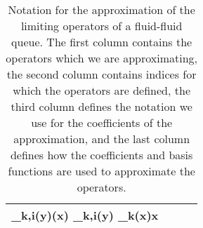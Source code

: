 \begin{table}[h!]
\begin{tabular}{c|c|c|c}
	 \bbpi_{k,i}(y)(\wrt x) %
	\approx\bs{\pi}_{k,i}(y) \bs \phi_k(x)\tr{}\wrt x
	\)\\\hline
 \end{tabular}
 \caption{Notation for the approximation of the limiting operators of a fluid-fluid queue. The first column contains the operators which we are approximating, the second column contains indices for which the operators are defined, the third column defines the notation we use for the coefficients of the approximation, and the last column defines how the coefficients and basis functions are used to approximate the operators. \label{table:notations}}
 \end{table}


